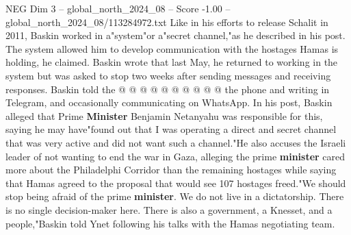 \begin{textsample}{NEG Dim 3 – global\_north\_2024\_08 – Score -1.00 – global\_north\_2024\_08/113284972.txt}
Like in his efforts to release Schalit in 2011, Baskin worked in a"system"or a"secret channel,"as he described in his post.
The system allowed him to develop communication with the hostages Hamas is holding, he claimed.
Baskin wrote that last May, he returned to working in the system but was asked to stop two weeks after sending messages and receiving responses.
Baskin told the @ @ @ @ @ @ @ @ @ @ the phone and writing in Telegram, and occasionally communicating on WhatsApp.
In his post, Baskin alleged that Prime \textbf{Minister} Benjamin Netanyahu was responsible for this, saying he may have"found out that I was operating a direct and secret channel that was very active and did not want such a channel."He also accuses the Israeli leader of not wanting to end the war in Gaza, alleging the prime \textbf{minister} cared more about the Philadelphi Corridor than the remaining hostages while saying that Hamas agreed to the proposal that would see 107 hostages freed."We should stop being afraid of the prime \textbf{minister}.
We do not live in a dictatorship.
There is no single decision-maker here.
There is also a government, a Knesset, and a people,"Baskin told Ynet following his talks with the Hamas negotiating team.

\end{textsample}
